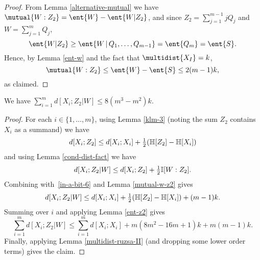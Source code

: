 \begin{proof}
  From Lemma \ref{alternative-mutual} we have $\mutual{W : Z_2} = \ent{W} - \ent{W | Z_2}$, and since $Z_2 = \sum_{j=1}^{m-1} j Q_j$ and $W = \sum_{j=1}^m Q_j$,
  \[
    \ent{W | Z_2} \geq \ent{W \,|\, Q_1,\dots,Q_{m-1}} = \ent{Q_m} = \ent{S}.
  \]
  Hence, by Lemma \ref{ent-w} and the fact that $\multidist{X_I} = k$,
  \[
    \mutual{W : Z_2} \leq \ent{W} - \ent{S} \leq 2 (m-1) k,
  \]
  as claimed.
\end{proof}

\begin{lemma}\label{xi-z2-w-dist} We have $\sum_{i=1}^m d[X_i;Z_2|W] \leq 8(m^3-m^2) k$.
\end{lemma}

\begin{proof}
  For each $i \in \{1,\dots, m\}$, using Lemma \ref{klm-3} (noting the sum $Z_2$ contains $X_i$ as a summand) we have
  \begin{equation}\label{in-a-bit-6}
    d[X_i;Z_2] \leq d[X_i;X_i] + \tfrac12 (\mathbb{H}[Z_2] - \mathbb{H}[X_i])
  \end{equation}
  and using Lemma \ref{cond-dist-fact} we have
  \[
    d[X_i;Z_2 | W] \leq d[X_i;Z_2] + \tfrac12 \mathbb{I}[W : Z_2].
  \]
 Combining with~\eqref{in-a-bit-6} and Lemma \ref{mutual-w-z2} gives
 \[ d[X_i;Z_2 | W] \leq d[X_i;X_i] + \tfrac12 (\mathbb{H}[Z_2] - \mathbb{H}[X_i]) + (m-1)k.\]
 Summing over $i$ and applying Lemma \ref{ent-z2} gives
 \[ \sum_{i = 1}^m d[X_i;Z_2 | W] \leq \sum_{i = 1}^m d[X_i;X_i] + m(8m^2-16m+1) k + m(m-1) k.\]
Finally, applying Lemma \ref{multidist-ruzsa-II} (and dropping some lower order terms) gives the claim.
\end{proof}

